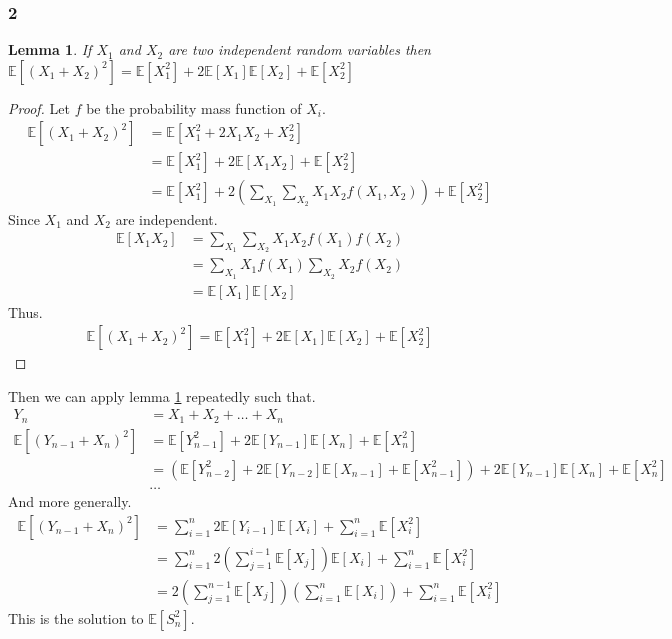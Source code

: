 \documentclass[12pt]{amsart}
\theoremstyle{plain}
\newtheorem{lem}[thm]{Lemma}
\theoremstyle{definition}
\begin{document}
\subsubsection*{2}
\begin{lem}
\label{lem:square_random_variables}
If $X_1$ and $X_2$ are two independent random variables then $\mathbb{E}[(X_1 + X_2)^2] = \mathbb{E}[X_1^2] + 2 \mathbb{E}[X_1] \mathbb{E}[X_2] + \mathbb{E}[X_2^2]$
\end{lem}
\begin{proof}
Let $f$ be the probability mass function of $X_i$.
\begin{align*}
  \mathbb{E}[(X_1 + X_2)^2] &= \mathbb{E}[X_1^2 + 2X_1X_2 + X_2^2] \\
  &= \mathbb{E}[X_1^2] + 2\mathbb{E}[X_1X_2] + \mathbb{E}[X_2^2] \\
  &= \mathbb{E}[X_1^2] + 2 \left( \sum_{X_1} \sum_{X_2} X_1 X_2 f(X_1, X_2) \right) + \mathbb{E}[X_2^2]
\end{align*}
Since $X_1$ and $X_2$ are independent.
\begin{align*}
  \mathbb{E}[X_1X_2] &= \sum_{X_1} \sum_{X_2} X_1 X_2 f(X_1) f(X_2) \\
  &= \sum_{X_1} X_1 f(X_1) \sum_{X_2} X_2 f(X_2) \\
  &= \mathbb{E}[X_1] \mathbb{E}[X_2]
\end{align*}
Thus.
\begin{align*}
\mathbb{E}[(X_1 + X_2)^2] = \mathbb{E}[X_1^2] + 2 \mathbb{E}[X_1] \mathbb{E}[X_2] + \mathbb{E}[X_2^2]
\end{align*}
\end{proof}
Then we can apply lemma \ref{lem:square_random_variables} repeatedly such that.
\begin{align*}
  Y_n &= X_1 + X_2 + \dots + X_n \\
  \mathbb{E}[(Y_{n - 1} + X_n)^2] &= \mathbb{E}[Y_{n - 1}^2] + 2 \mathbb{E}[Y_{n - 1}] \mathbb{E}[X_n] + \mathbb{E}[X_n^2] \\
  &= (\mathbb{E}[Y_{n - 2}^2] + 2 \mathbb{E}[Y_{n - 2}] \mathbb{E}[X_{n-1}] + \mathbb{E}[X_{n-1}^2]) + 2 \mathbb{E}[Y_{n - 1}] \mathbb{E}[X_n] + \mathbb{E}[X_n^2]\\
  &\dots
\end{align*}
And more generally.
\begin{align*}
  \mathbb{E}[(Y_{n - 1} + X_n)^2] &= \sum_{i=1}^n 2 \mathbb{E}[Y_{i - 1}] \mathbb{E}[X_i] + \sum_{i=1}^n \mathbb{E}[X_i^2] \\
  &= \sum_{i=1}^n 2 \left( \sum_{j=1}^{i-1} \mathbb{E}[X_j] \right) \mathbb{E}[X_i] + \sum_{i=1}^n \mathbb{E}[X_i^2] \\
  &= 2 \left ( \sum_{j=1}^{n - 1} \mathbb{E}[X_j] \right) \left( \sum_{i=1}^n \mathbb{E}[X_i] \right) + \sum_{i=1}^n \mathbb{E}[X_i^2]
\end{align*}
This is the solution to $\mathbb{E}[S_n^2]$.
\end{document}
